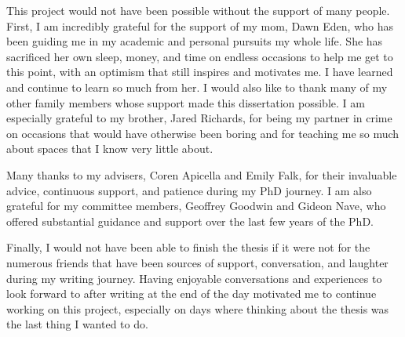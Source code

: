\documentclass[letterpaper, nobind]{templates/ociamthesis}
\makeatletter
\def\cleardoublepage{\clearpage\if@twoside \ifodd\c@page\else
   \hbox{}
   \fancyhead[C]{}
   \newpage
   \if@twocolumn\hbox{}\newpage
   \fi
   \fancyhead[LO]{\emph{\leftmark}} 
   \fancyhead[RE]{\emph{\rightmark}} 
   \fi\fi}
\makeatother
\begin{document}
\begin{romanpages}





\cleardoublepage
{}
{}
\renewcommand{\numberstyleacks}{plain}
\renewcommand{\numberstyleabstract}{plain}

\begin{acknowledgements}
 	This project would not have been possible without the support of many people. First, I am incredibly grateful for the support of my mom, Dawn Eden, who has been guiding me in my academic and personal pursuits my whole life. She has sacrificed her own sleep, money, and time on endless occasions to help me get to this point, with an optimism that still inspires and motivates me. I have learned and continue to learn so much from her. I would also like to thank many of my other family members whose support made this dissertation possible. I am especially grateful to my brother, Jared Richards, for being my partner in crime on occasions that would have otherwise been boring and for teaching me so much about spaces that I know very little about.

  Many thanks to my advisers, Coren Apicella and Emily Falk, for their invaluable advice, continuous support, and patience during my PhD journey. I am also grateful for my committee members, Geoffrey Goodwin and Gideon Nave, who offered substantial guidance and support over the last few years of the PhD.

  Finally, I would not have been able to finish the thesis if it were not for the numerous friends that have been sources of support, conversation, and laughter during my writing journey. Having enjoyable conversations and experiences to look forward to after writing at the end of the day motivated me to continue working on this project, especially on days where thinking about the thesis was the last thing I wanted to do.
\end{acknowledgements}




\end{romanpages}
\end{document}
